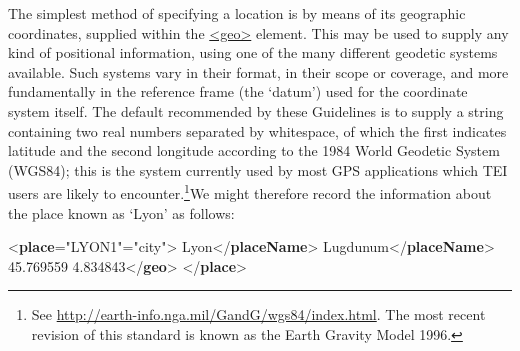 The simplest method of specifying a location is by means of its geographic coordinates, supplied within the \hyperref[TEI.geo]{<geo>} element. This may be used to supply any kind of positional information, using one of the many different geodetic systems available. Such systems vary in their format, in their scope or coverage, and more fundamentally in the reference frame (the ‘datum’) used for the coordinate system itself. The default recommended by these Guidelines is to supply a string containing two real numbers separated by whitespace, of which the first indicates latitude and the second longitude according to the 1984 World Geodetic System (WGS84); this is the system currently used by most GPS applications which TEI users are likely to encounter.\footnote{See \url{http://earth-info.nga.mil/GandG/wgs84/index.html}. The most recent revision of this standard is known as the Earth Gravity Model 1996.}We might therefore record the information about the place known as ‘Lyon’ as follows: \par\bgroup{}\exampleFont \begin{shaded}\noindent\mbox{}{<\textbf{place}\hspace*{1em}{xml:id}="{LYON1}"\hspace*{1em}{type}="{city}">}\mbox{}\newline 
{}Lyon{</\textbf{placeName}>}\mbox{}\newline 
{}Lugdunum{</\textbf{placeName}>}\mbox{}\newline 
{}\mbox{}\newline 
\hspace*{1em}45.769559 4.834843{</\textbf{geo}>}\mbox{}\newline 
{}\mbox{}\newline 
{</\textbf{place}>}\end{shaded}\egroup\par \par

